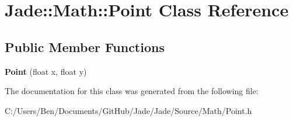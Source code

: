 \hypertarget{class_jade_1_1_math_1_1_point}{}\section{Jade\+:\+:Math\+:\+:Point Class Reference}
\label{class_jade_1_1_math_1_1_point}
\subsection*{Public Member Functions}
\begin{DoxyCompactItemize}
\item 
\hypertarget{class_jade_1_1_math_1_1_point_af7fb5d8ba845c62043aa8c1147dab365}{}{\bfseries Point} (float x, float y)\label{class_jade_1_1_math_1_1_point_af7fb5d8ba845c62043aa8c1147dab365}

\end{DoxyCompactItemize}


The documentation for this class was generated from the following file\+:\begin{DoxyCompactItemize}
\item 
C\+:/\+Users/\+Ben/\+Documents/\+Git\+Hub/\+Jade/\+Jade/\+Source/\+Math/Point.\+h\end{DoxyCompactItemize}
